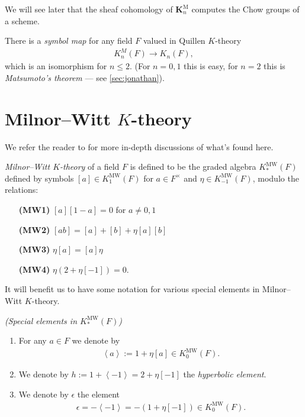 \documentclass[11pt,openany]{book}
\providecommand{\MW}{\mathrm{MW}}
\providecommand{\KM}{\mathbf{K}^\mathrm{M}}
\begin{document}
We will see later that the sheaf cohomology of $\KM_n$ computes the Chow groups of a scheme.

\begin{proposition}\label{prop:symbol_map} There is a \textit{symbol map} for any field $F$ valued in Quillen $K$-theory
\begin{align*}
    K_n^M(F) \to K_n(F),
\end{align*}
which is an isomorphism for $n\le 2$. (For $n=0,1$ this is easy, for $n=2$ this is \textit{Matsumoto's theorem} --- see \autoref{sec:jonathan}).
\end{proposition}

\section{Milnor--Witt \texorpdfstring{$K$}{K}-theory} We refer the reader to \cite{Deglise-KMW,Carlier} for more in-depth discussions of what's found here.

\begin{definition}\label{def:MW} 
\textit{Milnor--Witt $K$-theory} of a field $F$ is defined to be the graded algebra $K_\ast^\MW(F)$ defined by symbols $[a]\in K_1^{\MW}(F)$ for $a\in F^\times$ and $\eta \in K_{-1}^\MW(F)$, modulo the relations:
\begin{enumerate}
    \item[\textbf{(MW1)}] $[a][1-a] = 0$ for $a\ne 0,1$
    \item[\textbf{(MW2)}] $[ab] = [a]+[b] + \eta[a][b]$
    \item[\textbf{(MW3)}] $\eta[a]=[a]\eta$
    \item[\textbf{(MW4)}] $\eta(2+\eta[-1]) = 0$.
\end{enumerate}
\end{definition}

It will benefit us to have some notation for various special elements in Milnor--Witt $K$-theory.

\begin{notation}\label{nota:special-elts-KMW} \textit{(Special elements in $K_\ast^\MW(F)$)}
\begin{enumerate}
    \item For any $a \in F$ we denote by
\begin{align*}
    \left\langle a \right\rangle := 1 + \eta[a] \in K_0^\MW(F).
\end{align*}
    \item We denote by $h := 1 + \left\langle -1 \right\rangle = 2 + \eta[-1]$ the \textit{hyperbolic element}.
    \item We denote by $\epsilon$ the element
    \begin{align*}
        \epsilon = - \left\langle -1 \right\rangle = -(1 + \eta[-1]) \in K_0^\MW(F).
    \end{align*}
\end{enumerate}
\end{notation}
\end{document}
